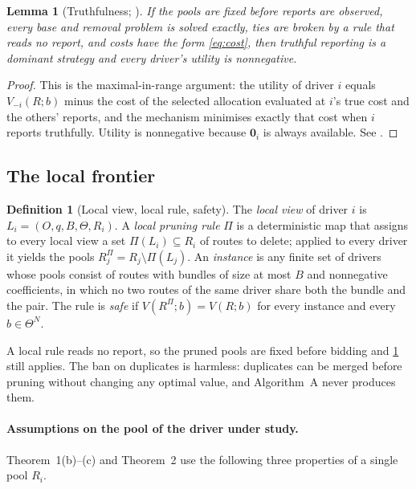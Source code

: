 \documentclass[11pt]{article}
\newtheorem{plemma}{Lemma}
\theoremstyle{definition}
\newtheorem{definition}{Definition}
\theoremstyle{remark}
\newcommand{\idle}{\mathbf{0}}
\begin{document}
\begin{plemma}[Truthfulness; \citealp{nisan2007computationally}]\label{lem:dsic}
If the pools are fixed before reports are observed, every base and removal
problem is solved exactly, ties are broken by a rule that reads no report, and
costs have the form \eqref{eq:cost}, then truthful reporting is a dominant
strategy and every driver's utility is nonnegative.
\end{plemma}

\begin{proof}
This is the maximal-in-range argument: the utility of driver $i$ equals
$V_{-i}(R;b)$ minus the cost of the selected allocation evaluated at $i$'s true
cost and the others' reports, and the mechanism minimises exactly that cost
when $i$ reports truthfully. Utility is nonnegative because $\idle_i$ is always
available. See \citet{nisan2007computationally}.
\end{proof}

\subsection{The local frontier}
\label{sec:frontier}

\begin{definition}[Local view, local rule, safety]\label{def:local}
The \emph{local view} of driver $i$ is $L_i=(O,q,B,\Theta,R_i)$. A
\emph{local pruning rule} $\Pi$ is a deterministic map that assigns to every
local view a set $\Pi(L_i)\subseteq R_i$ of routes to delete; applied to every
driver it yields the pools $R^\Pi_j=R_j\setminus\Pi(L_j)$. An \emph{instance}
is any finite set of drivers whose pools consist of routes with bundles of size
at most $B$ and nonnegative coefficients, in which no two routes of the same
driver share both the bundle and the pair. The rule is \emph{safe} if
$V(R^\Pi;b)=V(R;b)$ for every instance and every $b\in\Theta^N$.
\end{definition}

A local rule reads no report, so the pruned pools are fixed before bidding and
\cref{lem:dsic} still applies. The ban on duplicates is harmless: duplicates can
be merged before pruning without changing any optimal value, and Algorithm~A
never produces them.

\paragraph{Assumptions on the pool of the driver under study.}
Theorem~1(b)--(c) and Theorem~2 use the following three properties of a single
pool $R_i$.
\end{document}
